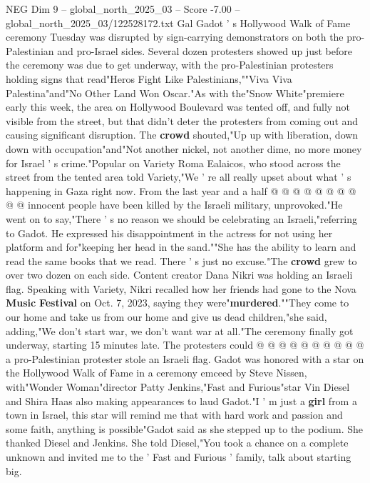 \begin{textsample}{NEG Dim 9 – global\_north\_2025\_03 – Score -7.00 – global\_north\_2025\_03/122528172.txt}  \label{ex:f9_neg_145}
Gal Gadot ' s Hollywood Walk of Fame ceremony Tuesday was disrupted by sign-carrying demonstrators on both the pro-Palestinian and pro-Israel sides.
Several dozen protesters showed up just before the ceremony was due to get underway, with the pro-Palestinian protesters holding signs that read"Heros Fight Like Palestinians,""Viva Viva Palestina"and"No Other Land Won Oscar."As with the"Snow White"premiere early this week, the area on Hollywood Boulevard was tented off, and fully not visible from the street, but that didn't deter the protesters from coming out and causing significant disruption.
The \textbf{crowd} shouted,"Up up with liberation, down down with occupation"and"Not another nickel, not another dime, no more money for Israel ' s crime."Popular on Variety Roma Ealaicos, who stood across the street from the tented area told Variety,"We ' re all really upset about what ' s happening in Gaza right now.
From the last year and a half @ @ @ @ @ @ @ @ @ @ innocent people have been killed by the Israeli military, unprovoked."He went on to say,"There ' s no reason we should be celebrating an Israeli,"referring to Gadot.
He expressed his disappointment in the actress for not using her platform and for"keeping her head in the sand.""She has the ability to learn and read the same books that we read.
There ' s just no excuse."The \textbf{crowd} grew to over two dozen on each side.
Content creator Dana Nikri was holding an Israeli flag.
Speaking with Variety, Nikri recalled how her friends had gone to the Nova \textbf{Music} \textbf{Festival} on Oct. 7, 2023, saying they were"\textbf{murdered}.""They come to our home and take us from our home and give us dead children,"she said, adding,"We don't start war, we don't want war at all."The ceremony finally got underway, starting 15 minutes late.
The protesters could @ @ @ @ @ @ @ @ @ @ a pro-Palestinian protester stole an Israeli flag.
Gadot was honored with a star on the Hollywood Walk of Fame in a ceremony emceed by Steve Nissen, with"Wonder Woman"director Patty Jenkins,"Fast and Furious"star Vin Diesel and Shira Haas also making appearances to laud Gadot."I ' m just a \textbf{girl} from a town in Israel, this star will remind me that with hard work and passion and some faith, anything is possible"Gadot said as she stepped up to the podium.
She thanked Diesel and Jenkins.
She told Diesel,"You took a chance on a complete unknown and invited me to the ' Fast and Furious ' family, talk about starting big.

\end{textsample}
